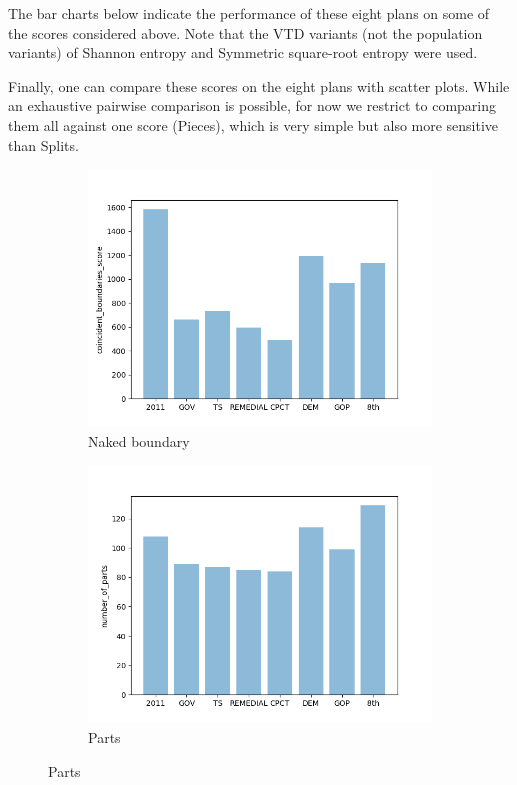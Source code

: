 \documentclass{mgggarticle}
\begin{document}
The bar charts below indicate the performance of these eight plans on some of the scores considered above. Note that the VTD variants (not the population variants) of Shannon entropy and Symmetric square-root entropy were used.

Finally, one can compare these scores on the eight plans with scatter plots. While an exhaustive pairwise comparison is possible, for now we restrict to comparing them all against one score (Pieces), which is very simple but also more sensitive than Splits.

\begin{figure}
\centering
\begin{subfigure}{0.4\textwidth}
\centering
\includegraphics[width=\textwidth]{bars/coincident_boundaries_score_bar.png}
\caption{Naked boundary}
\end{subfigure}
\begin{subfigure}{0.4\textwidth}
\centering
\includegraphics[width=\textwidth]{bars/number_of_parts_bar.png}
\caption{Parts}
\end{subfigure}


\end{figure}
\end{document}
